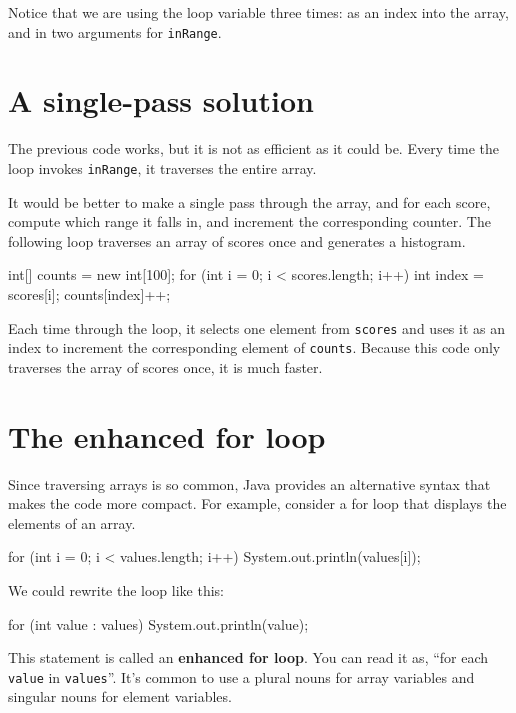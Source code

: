 \documentclass[12pt]{book}
\theoremstyle{exercise}
\newcommand{\java}[1]{\verb"#1"}
\begin{document}
Notice that we are using the loop variable three times: as an index into the array, and in two arguments for \java{inRange}.


\section{A single-pass solution}
\label{singlepass}

The previous code works, but it is not as efficient as it could be.
Every time the loop invokes \java{inRange}, it traverses the entire array.

It would be better to make a single pass through the array, and for each score, compute which range it falls in, and increment the corresponding counter.
The following loop traverses an array of scores once and generates a histogram.

\begin{code}
    int[] counts = new int[100];
    for (int i = 0; i < scores.length; i++) {
        int index = scores[i];
        counts[index]++;
    }
\end{code}

Each time through the loop, it selects one element from \java{scores} and uses it as an index to increment the corresponding element of \java{counts}.
Because this code only traverses the array of scores once, it is much faster.


\section{The enhanced for loop}
\label{enhanced}

Since traversing arrays is so common, Java provides an alternative syntax that makes the code more compact.
For example, consider a for loop that displays the elements of an array.

\begin{code}
    for (int i = 0; i < values.length; i++) {
        System.out.println(values[i]);
    }
\end{code}

We could rewrite the loop like this:

\begin{code}
    for (int value : values) {
        System.out.println(value);
    }
\end{code}

This statement is called an {\bf enhanced for loop}.
You can read it as, ``for each \java{value} in \java{values}''.
It's common to use a plural nouns for array variables and singular nouns for element variables.
\end{document}
